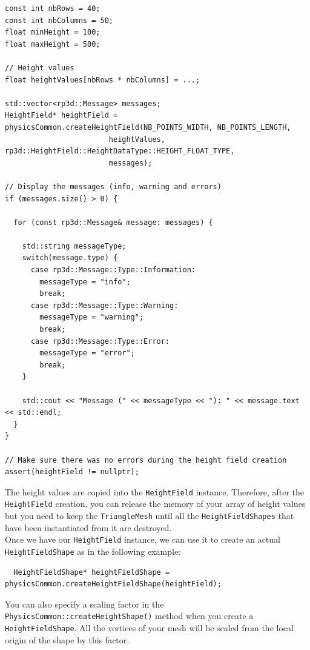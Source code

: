 \documentclass[a4paper,12pt]{article}
\begin{document}
  \begin{lstlisting}
const int nbRows = 40;
const int nbColumns = 50;
float minHeight = 100;
float maxHeight = 500;

// Height values
float heightValues[nbRows * nbColumns] = ...;

std::vector<rp3d::Message> messages;
HeightField* heightField = physicsCommon.createHeightField(NB_POINTS_WIDTH, NB_POINTS_LENGTH,
					    heightValues, rp3d::HeightField::HeightDataType::HEIGHT_FLOAT_TYPE,
					    messages);

// Display the messages (info, warning and errors)
if (messages.size() > 0) {

  for (const rp3d::Message& message: messages) {

    std::string messageType;
    switch(message.type) {
      case rp3d::Message::Type::Information:
        messageType = "info";
        break;
      case rp3d::Message::Type::Warning:
        messageType = "warning";
        break;
      case rp3d::Message::Type::Error:
        messageType = "error";
        break;
    }

    std::cout << "Message (" << messageType << "): " << message.text << std::endl;
  }
}

// Make sure there was no errors during the height field creation
assert(heightField != nullptr);
  \end{lstlisting}

  \vspace{0.6cm}

  The height values are copied into the \texttt{HeightField} instance. Therefore, after the \texttt{HeightField} creation, you can release the memory
  of your array of height values but you need to keep the \texttt{TriangleMesh} until all the \texttt{HeightFieldShapes} that have been instantiated from
  it are destroyed. \\

  Once we have our \texttt{HeightField} instance, we can use it to create an actual \texttt{HeightFieldShape} as in the following example: \\

  \begin{lstlisting}
  HeightFieldShape* heightFieldShape = physicsCommon.createHeightFieldShape(heightField);
  \end{lstlisting}

  \vspace{0.6cm}
  You can also specify a scaling factor in the \texttt{PhysicsCommon::createHeightShape()} method when you create a \texttt{Height\allowbreak FieldShape}.
  All the vertices of your mesh will be scaled from the local origin of the shape by this factor. \\
\end{document}
